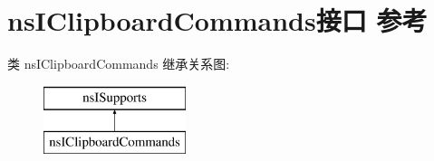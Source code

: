 \hypertarget{interfacens_i_clipboard_commands}{}\section{ns\+I\+Clipboard\+Commands接口 参考}
\label{interfacens_i_clipboard_commands}
类 ns\+I\+Clipboard\+Commands 继承关系图\+:\begin{figure}[H]
\begin{center}
\leavevmode
\includegraphics[height=2.000000cm]{interfacens_i_clipboard_commands}
\end{center}
\end{figure}
